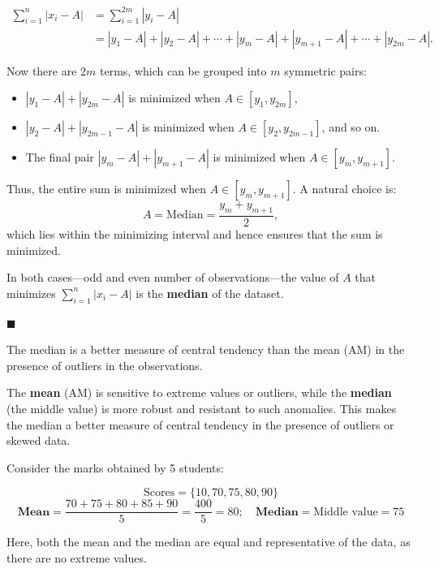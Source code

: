 \documentclass[twoside]{book}
\begin{document}
\begin{itemize}
    \begin{align*}
    \sum_{i=1}^{n} |x_i - A| &= \sum_{i=1}^{2m} |y_i - A| \\
    &= |y_1 - A| + |y_2 - A| + \cdots + |y_m - A| + |y_{m+1} - A| + \cdots + |y_{2m} - A|.
    \end{align*}

    Now there are \( 2m \) terms, which can be grouped into \( m \) symmetric pairs:

    \begin{itemize}
        \item \( |y_1 - A| + |y_{2m} - A| \) is minimized when \( A \in [y_1, y_{2m}] \),
        \item \( |y_2 - A| + |y_{2m-1} - A| \) is minimized when \( A \in [y_2, y_{2m-1}] \), and so on.
        \item The final pair \( |y_m - A| + |y_{m+1} - A| \) is minimized when \( A \in [y_m, y_{m+1}] \).
    \end{itemize}

    Thus, the entire sum is minimized when \( A \in [y_m, y_{m+1}] \). A natural choice is:
    \[
    A = \text{Median} = \frac{y_m + y_{m+1}}{2},
    \]
    which lies within the minimizing interval and hence ensures that the sum is minimized.
\end{itemize}

In both cases—odd and even number of observations—the value of \( A \) that minimizes \( \sum_{i=1}^{n} |x_i - A| \) is the \textbf{median} of the dataset.

    \hfill $\blacksquare$

\begin{textbox}
The median is a better measure of central tendency than the mean (AM) in the presence of outliers in the observations.
\end{textbox}

The \textbf{mean} (AM) is sensitive to extreme values or outliers, while the \textbf{median} (the middle value) is more robust and resistant to such anomalies. This makes the median a better measure of central tendency in the presence of outliers or skewed data.

Consider the marks obtained by 5 students:

\[
\text{Scores} = \{10, 70, 75, 80, 90\}
\]
\[\textbf{Mean} = \frac{70 + 75 + 80 + 85 + 90}{5} = \frac{400}{5} = 80; \quad \textbf{Median} = \text{Middle value} = 75
\]

Here, both the mean and the median are equal and representative of the data, as there are no extreme values.
\end{document}
